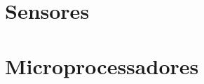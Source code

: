 \section{Sensores}

\section{Microprocessadores}




\begin{comment}
	\section{Síntese de Som}
	A síntese sonora é uma técnica de geração de som utilizando equipamentos eletrônicos ou softwares, a partir do zero. O objetivo principal não é imitar sons existentes e sim criar sons totalmente novos. Um sintetizador, um instrumento musical eletrônico como a Figura \ref{fig:sintetizador}, tem a capacidade de emitir sons de piano, flauta, violão, mas o foco é criação de novos sons com timbres diferentes. Como um sintetizador, o computador também é um ferramenta a utilizar-se na síntese sonora.

	\begin{figure}[!htb]
	\centering
		\texttt{[image: sintetizador]}
		\caption{Exemplo de sintetizador: Roland Gaia. Fonte: Desconhecido.}
		\label{fig:sintetizador}
	\end{figure}

	Ao escolher técnicas para realizar a síntese há uma vasta gama de técnicas como síntese granular, aditiva, subtrativa entre outras.


	-----------ESCREVER MAIS


	\section{Processo Criativo}
	O processo criativo é importante para o \textit{Live Coding} pela natureza perfomática da arte, fazendo-se necessário abordar sobre composição musical e improvisação.  

	\subsection{Música}
	De acordo com \cite{lacerda1966} a música é a arte dos sons, as principais partes da música são: melodia, ritmo, harmonia.


\end{comment}
